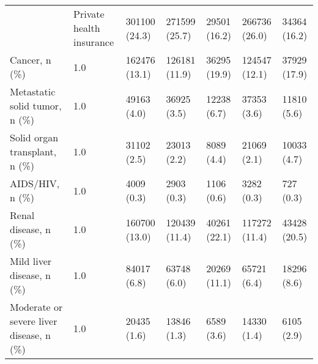 \begin{tabular}{L{20em}C{10em}C{10em}C{10em}C{10em}C{10em}}
                                                   &            \hspace{3mm} Private health insurance &      301100 (24.3) &                           271599 (25.7) &                        29501 (16.2) &                            266736 (26.0) &                        34364 (16.2) \\
                                     Cancer, n (\%) &                                 \hspace{3mm} 1.0 &      162476 (13.1) &                           126181 (11.9) &                        36295 (19.9) &                            124547 (12.1) &                        37929 (17.9) \\
                     Metastatic solid tumor, n (\%) &                                 \hspace{3mm} 1.0 &        49163 (4.0) &                             36925 (3.5) &                         12238 (6.7) &                              37353 (3.6) &                         11810 (5.6) \\
                     Solid organ transplant, n (\%) &                                 \hspace{3mm} 1.0 &        31102 (2.5) &                             23013 (2.2) &                          8089 (4.4) &                              21069 (2.1) &                         10033 (4.7) \\
                                   AIDS/HIV, n (\%) &                                 \hspace{3mm} 1.0 &         4009 (0.3) &                              2903 (0.3) &                          1106 (0.6) &                               3282 (0.3) &                           727 (0.3) \\
                              Renal disease, n (\%) &                                 \hspace{3mm} 1.0 &      160700 (13.0) &                           120439 (11.4) &                        40261 (22.1) &                            117272 (11.4) &                        43428 (20.5) \\
                         Mild liver disease, n (\%) &                                 \hspace{3mm} 1.0 &        84017 (6.8) &                             63748 (6.0) &                        20269 (11.1) &                              65721 (6.4) &                         18296 (8.6) \\
           Moderate or severe liver disease, n (\%) &                                 \hspace{3mm} 1.0 &        20435 (1.6) &                             13846 (1.3) &                          6589 (3.6) &                              14330 (1.4) &                          6105 (2.9) \\

\end{tabular}
